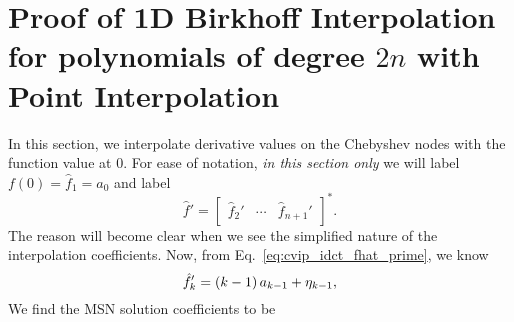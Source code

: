 \section{Proof of 1D Birkhoff Interpolation for polynomials of degree $2n$
    with Point Interpolation}
\label{sec:cvip_birkhoff_pt}

In this section, we interpolate derivative values on the Chebyshev
nodes with the function value at $0$. For ease of notation,
\emph{in this section only} we will label $f(0) = \hat{f}_{1} = a_{0}$ and
label
%
\begin{equation}
    \hat{f}' = \begin{bmatrix} \hat{f}_{2}' & \cdots & \hat{f}_{n+1}'
        \end{bmatrix}^{*}.
\end{equation}
%
The reason will become clear when we see the simplified nature of the
interpolation coefficients.
Now, from Eq.~\eqref{eq:cvip_idct_fhat_prime}, we know
%
\begin{equation}
    \hat{f}_{k}' = \left( k-1 \right)a_{k-1} + \eta_{k-1},
\end{equation}
%
We find the MSN solution coefficients to be
%
